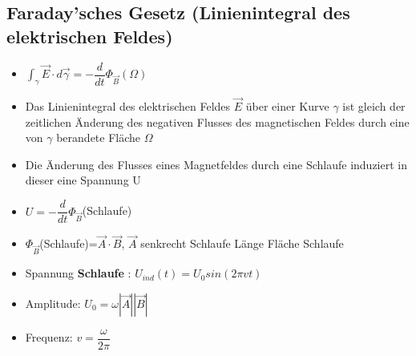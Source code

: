 \documentclass[8pt,a4paper]{scrartcl}
\begin{document}
\begin{multicols*}{3}
				\subsection{Faraday'sches Gesetz (Linienintegral des elektrischen Feldes)}
					\begin{itemize}\itemsep0pt
						\item $\int_{\gamma} \overrightarrow{E} \cdot d \overrightarrow{\gamma} = - \dfrac{d}{dt} \Phi_{\overrightarrow{B}}(\Omega)$
						\item Das Linienintegral des elektrischen Feldes $\overrightarrow{E}$ über einer Kurve $\gamma$ ist gleich der zeitlichen Änderung des negativen Flusses des magnetischen Feldes durch eine von $\gamma$ berandete Fläche $\Omega$
						\item Die Änderung des Flusses eines Magnetfeldes durch eine Schlaufe induziert in dieser eine Spannung U
						\item $U=-\dfrac{d}{dt}\Phi_{\overrightarrow{B}}$(Schlaufe)
						\item $\Phi_{\overrightarrow{B}}$(Schlaufe)=$\overrightarrow{A}\cdot \overrightarrow{B}$, $\overrightarrow{A}$ senkrecht Schlaufe Länge Fläche Schlaufe
						\item Spannung \textbf{Schlaufe} : $U_{ind}(t) = U_{0}sin(2\pi vt)$
						\item Amplitude: $U_{0} = \omega |\overrightarrow{A}||\overrightarrow{B}|$
						\item Frequenz: $v = \dfrac{\omega}{2\pi}$
					\end{itemize}	

\end{multicols*}
\end{document}
